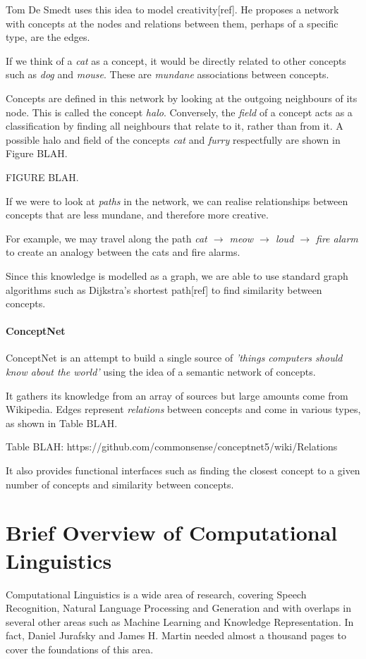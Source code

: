 Tom De Smedt uses this idea to model creativity[ref]. He proposes a network with concepts at the nodes and relations between them, perhaps of a specific type, are the edges.

If we think of a \textit{cat} as a concept, it would be directly related to other concepts such as \textit{dog} and \textit{mouse}. These are \textit{mundane} associations between concepts.

Concepts are defined in this network by looking at the outgoing neighbours of its node. This is called the concept \textit{halo}. Conversely, the \textit{field} of a concept acts as a classification by finding all neighbours that relate to it, rather than from it. A possible halo and field of the concepts \textit{cat} and \textit{furry} respectfully are shown in Figure BLAH.

FIGURE BLAH. 

If we were to look at \textit{paths} in the network, we can realise relationships between concepts that are less mundane, and therefore more creative.

For example, we may travel along the path \textit{cat $\rightarrow$ meow $\rightarrow$ loud $\rightarrow$ fire alarm} to create an analogy between the cats and fire alarms.

Since this knowledge is modelled as a graph, we are able to use standard graph algorithms such as Dijkstra's shortest path[ref] to find similarity between concepts.

\paragraph{ConceptNet}
ConceptNet\cite{liu2004conceptnet} is an attempt to build a single source of \textit{'things computers should know about the world'} using the idea of a semantic network of concepts.

It gathers its knowledge from an array of sources but large amounts come from Wikipedia. Edges represent \textit{relations} between concepts and come in various types, as shown in Table BLAH.

Table BLAH: https://github.com/commonsense/conceptnet5/wiki/Relations

It also provides functional interfaces such as finding the closest concept to a given number of concepts and similarity between concepts.

\section{Brief Overview of Computational Linguistics}
Computational Linguistics is a wide area of research, covering Speech Recognition, Natural Language Processing and Generation and with overlaps in several other areas such as Machine Learning and Knowledge Representation. In fact, Daniel Jurafsky and James H. Martin needed almost a thousand pages to cover the foundations of this area\cite{jurafsky2000speech}.

